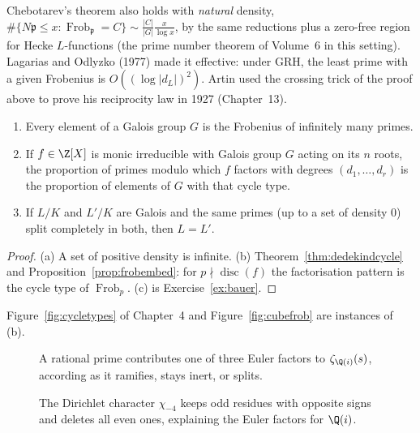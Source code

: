 \begin{remark}
Chebotarev's theorem also holds with \emph{natural} density, $\#\{N\mathfrak p\le x:\operatorname{Frob}_{\mathfrak p}=C\}\sim\frac{|C|}{|G|}\frac x
{\log x}$, by the same reductions plus a zero-free region for Hecke $L$-functions (the prime number theorem of Volume~6 in this setting). Lagarias
and Odlyzko (1977) made it effective: under GRH, the least prime with a given Frobenius is $O((\log|d_L|)^2)$. Artin used the crossing trick of
the proof above to prove his reciprocity law in 1927 (Chapter~13).
\end{remark}

\begin{corollary}\label{cor:chebcons}
\begin{enumerate}[label=(\alph*)]
\item Every element of a Galois group $G$ is the Frobenius of infinitely many primes.
\item If $f\in\Z[X]$ is monic irreducible with Galois group $G$ acting on its $n$ roots, the proportion of primes modulo which $f$ factors with
degrees $(d_1,\dots,d_r)$ is the proportion of elements of $G$ with that cycle type.
\item If $L/K$ and $L'/K$ are Galois and the same primes (up to a set of density $0$) split completely in both, then $L=L'$.
\end{enumerate}
\end{corollary}
\begin{proof}
(a) A set of positive density is infinite. (b) Theorem~\ref{thm:dedekindcycle} and Proposition~\ref{prop:frobembed}: for $p\nmid\operatorname{disc}(f)$
the factorisation pattern is the cycle type of $\operatorname{Frob}_p$. (c) is Exercise~\ref{ex:bauer}.
\end{proof}

Figure~\ref{fig:cycletypes} of Chapter~4 and Figure~\ref{fig:cubefrob} are instances of (b).

\begin{figure}[ht]
\centering
{}
\caption{A rational prime contributes one of three Euler factors to $\zeta_{\Q(i)}(s)$, according as it ramifies, stays inert, or splits.}
\label{fig:v13-extra-11-a}
\end{figure}

\begin{figure}[ht]
\centering
{}
\caption{The Dirichlet character $\chi_{-4}$ keeps odd residues with opposite signs and deletes all even ones, explaining the Euler factors for $\Q(i)$.}
\label{fig:v13-extra-11-b}
\end{figure}


